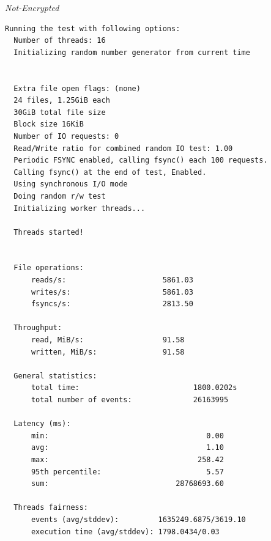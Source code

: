 \noindent\begin{minipage}[t]{0.45\linewidth}
  \centering
  \textit{Not-Encrypted}
  \begin{lstlisting}[basicstyle=\tiny,frame=single, label=cpu_test2]
  Running the test with following options:
  Number of threads: 16
  Initializing random number generator from current time
  
  
  Extra file open flags: (none)
  24 files, 1.25GiB each
  30GiB total file size
  Block size 16KiB
  Number of IO requests: 0
  Read/Write ratio for combined random IO test: 1.00
  Periodic FSYNC enabled, calling fsync() each 100 requests.
  Calling fsync() at the end of test, Enabled.
  Using synchronous I/O mode
  Doing random r/w test
  Initializing worker threads...
  
  Threads started!
  
  
  File operations:
      reads/s:                      5861.03
      writes/s:                     5861.03
      fsyncs/s:                     2813.50
  
  Throughput:
      read, MiB/s:                  91.58
      written, MiB/s:               91.58
  
  General statistics:
      total time:                          1800.0202s
      total number of events:              26163995
  
  Latency (ms):
      min:                                    0.00
      avg:                                    1.10
      max:                                  258.42
      95th percentile:                        5.57
      sum:                             28768693.60
  
  Threads fairness:
      events (avg/stddev):         1635249.6875/3619.10
      execution time (avg/stddev): 1798.0434/0.03
  \end{lstlisting}
\end{minipage}

